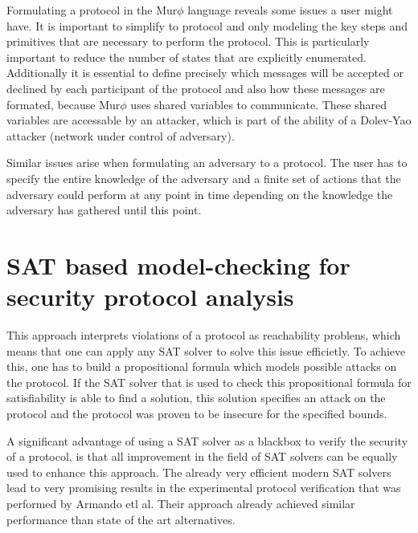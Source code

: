 \documentclass[a4paper,UKenglish]{lipics-v2018}
\def\murphi{Mur$\phi$ }
\begin{document}
Formulating a protocol in the \murphi language reveals some issues a user might have. It is important to simplify to protocol and only modeling the key steps and primitives that are necessary to perform the protocol. This is particularly important to reduce the number of states that are explicitly enumerated. Additionally it is essential to define precisely which messages will be accepted or declined by each participant of the protocol and also how these messages are formated, because \murphi uses shared variables to communicate. These shared variables are accessable by an attacker, which is part of the ability of a Dolev-Yao attacker (network under control of adversary).\cite{murphi}

Similar issues arise when formulating an adversary to a protocol. The user has to specify the entire knowledge of the adversary and a finite set of actions that the adversary could perform at any point in time depending on the knowledge the adversary has gathered until this point.\cite{murphi}






\newpage
\section{SAT based model-checking for security protocol analysis}

This approach interprets violations of a protocol as reachability problens, which means that one can apply any SAT solver to solve this issue efficietly. To achieve this, one has to build a propositional formula which models possible attacks on the protocol. If the SAT solver that is used to check this propositional formula for satisfiability is able to find a solution, this solution specifies an attack on the protocol and the protocol was proven to be insecure for the specified bounds.\cite{sat}

A significant advantage of using a SAT solver as a blackbox to verify the security of a protocol, is that all improvement in the field of SAT solvers can be equally used to enhance this approach. The already very efficient modern SAT solvers lead to very promising results in the experimental protocol verification that was performed by Armando etl al. Their approach already achieved similar performance than state of the art alternatives.\cite{sat}
\end{document}
